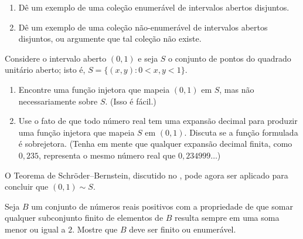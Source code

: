 \begin{exercise}\label{ex:intervalos-abertos-disjuntos}
\begin{enumerate}[label=\alph*)]
\item Dê um exemplo de uma coleção enumerável de intervalos abertos disjuntos.
\item Dê um exemplo de uma coleção não-enumerável de intervalos abertos disjuntos, ou argumente que tal coleção não existe.
\end{enumerate}
\end{exercise}

\begin{exercise}\label{ex:quadrado-unitario}
Considere o intervalo aberto $(0, 1)$ e seja $S$ o conjunto de pontos do quadrado unitário aberto; isto é, $S = \{(x, y) : 0 < x, y < 1\}$.
\begin{enumerate}[label=\alph*)]
\item Encontre uma função injetora que mapeia $(0, 1)$ em $S$, mas não necessariamente sobre $S$. (Isso é fácil.)
\item Use o fato de que todo número real tem uma expansão decimal para produzir uma função injetora que mapeia $S$ em $(0, 1)$. Discuta se a função formulada é sobrejetora. (Tenha em mente que qualquer expansão decimal finita, como $0{,}235$, representa o mesmo número real que $0{,}234999\ldots$)
\end{enumerate}
O Teorema de Schröder--Bernstein, discutido no , pode agora ser aplicado para concluir que $(0, 1) \sim S$. 
\end{exercise}

\begin{exercise}\label{ex:conjunto-somas-limitadas}
Seja $B$ um conjunto de números reais positivos com a propriedade de que somar qualquer subconjunto finito de elementos de $B$ resulta sempre em uma soma menor ou igual a $2$. Mostre que $B$ deve ser finito ou enumerável.
\end{exercise}

